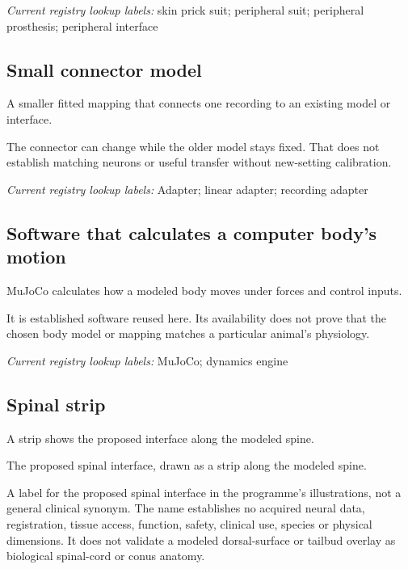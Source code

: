 \noindent\textit{Current registry lookup labels:} skin prick suit; peripheral suit; peripheral prosthesis; peripheral interface\par

\begin{samepage}
\subsection*{Small connector model}
\noindent A smaller fitted mapping that connects one recording to an existing model or interface.\par
\end{samepage}
\begin{samepage}
\noindent The connector can change while the older model stays fixed. That does not establish matching neurons or useful transfer without new-setting calibration.\par\nopagebreak[4]

\end{samepage}


\noindent\textit{Current registry lookup labels:} Adapter; linear adapter; recording adapter\par

\begin{samepage}
\subsection*{Software that calculates a computer body’s motion}
\noindent MuJoCo calculates how a modeled body moves under forces and control inputs.\par
\end{samepage}
\begin{samepage}
\noindent It is established software reused here. Its availability does not prove that the chosen body model or mapping matches a particular animal’s physiology.\par\nopagebreak[4]

\end{samepage}


\noindent\textit{Current registry lookup labels:} MuJoCo; dynamics engine\par

\subsection*{Spinal strip}
\noindent A strip shows the proposed interface along the modeled spine.\par
\noindent The proposed spinal interface, drawn as a strip along the modeled spine.\par
\noindent A label for the proposed spinal interface in the programme's illustrations, not a general clinical synonym. The name establishes no acquired neural data, registration, tissue access, function, safety, clinical use, species or physical dimensions. It does not validate a modeled dorsal-surface or tailbud overlay as biological spinal-cord or conus anatomy.\par

